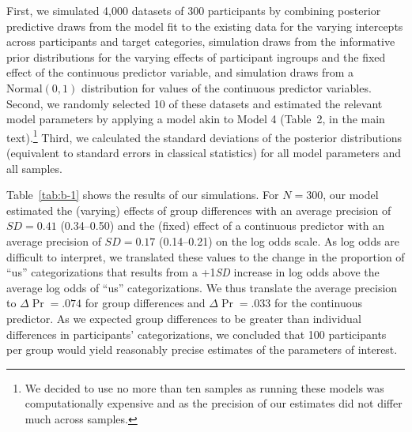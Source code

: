 \documentclass[12pt, a4paper]{article}
\begin{document}
\noindent First, we simulated 4,000 datasets of 300 participants by combining posterior predictive draws from the model fit to the existing data for the varying intercepts across participants and target categories, simulation draws from the informative prior distributions for the varying effects of participant ingroups and the fixed effect of the continuous predictor variable, and simulation draws from a $\text{Normal}(0, 1)$ distribution for values of the continuous predictor variables. Second, we randomly selected 10 of these datasets and estimated the relevant model parameters by applying a model akin to Model 4 (Table~2, in the main text).\footnote{We decided to use no more than ten samples as running these models was computationally expensive and as the precision of our estimates did not differ much across samples.} Third, we calculated the standard deviations of the posterior distributions (equivalent to standard errors in classical statistics) for all model parameters and all samples. 

Table~\ref{tab:b-1} shows the results of our simulations. For $N = 300$, our model estimated the (varying) effects of group differences with an average precision of $\textit{SD} = 0.41$ (0.34--0.50) and the (fixed) effect of a  continuous predictor with an average precision of $\textit{SD} = 0.17$ (0.14--0.21) on the log odds scale. As log odds are difficult to interpret, we translated these values to the change in the proportion of ``us'' categorizations that results from a +1\textit{SD} increase in log odds above the average log odds of ``us'' categorizations. We thus translate the average precision to $\Delta\Pr = .074$ for group differences and $\Delta\Pr = .033$ for the continuous predictor. As we expected group differences to be greater than individual differences in participants' categorizations, we concluded that 100 participants per group would yield reasonably precise estimates of the parameters of interest.
\end{document}
